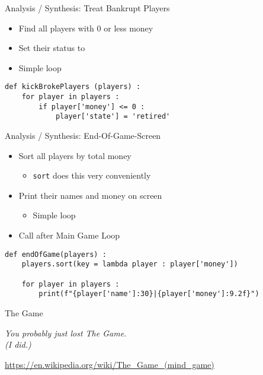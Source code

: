 
\begin{frame}[fragile]{Analysis / Synthesis: Treat Bankrupt Players}
%
\begin{itemize}
\item Find all players with 0 or less money
\item Set their status to 
\item Simple  loop
\end{itemize}
%
\begin{codebox}
\begin{verbatim}
def kickBrokePlayers (players) :
    for player in players :
        if player['money'] <= 0 :
            player['state'] = 'retired'
\end{verbatim}
\end{codebox}
%
\end{frame}


\begin{frame}[fragile]{Analysis / Synthesis: End-Of-Game-Screen}
%
\begin{itemize}
\item Sort all players by total money
	\begin{itemize}
	\item \texttt{sort} does this very conveniently
	\end{itemize}
\item Print their names and money on screen
	\begin{itemize}
	\item Simple  loop
	\end{itemize}
\item Call after Main Game Loop
\end{itemize}
%
\begin{codebox}
\begin{verbatim}
def endOfGame(players) :
    players.sort(key = lambda player : player['money'])
    
    for player in players :
        print(f"{player['name']:30}|{player['money']:9.2f}")
\end{verbatim}
\end{codebox}
%
\end{frame}


\begin{frame}{The Game}
%
\begin{center}
	\begin{large}
		\emph{You probably just lost The Game.}\\
		\emph{(I did.)}
	\end{large}
	
	\vspace{20pt}
	\url{https://en.wikipedia.org/wiki/The_Game_(mind_game)}
\end{center}
%
\end{frame}
